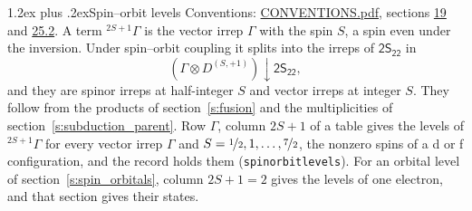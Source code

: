 \documentclass[10pt,a4paper]{article}
\makeatletter
\renewcommand\section{\@startsection{section}{1}{\z@}{-3ex plus -1ex minus -.2ex}%
  {1.2ex plus .2ex}{\normalfont\large\sffamily\bfseries\color{parttitle}}}
\numberwithin{equation}{section}
\newcommand{\grp}[1]{\mathsf{#1}}
\newcommand{\restr}[2]{#1\!\downarrow#2}
\newcommand{\irrJp}[2]{D^{(#1,#2)}}
\newcommand{\irrprod}{\otimes}
\newcommand{\term}[2]{{}^{#1}#2}
\makeatother
\begin{document}
\section{Spin--orbit levels}\label{s:spin_orbit}
Conventions: \href{../../CONVENTIONS.pdf}{CONVENTIONS.pdf}, sections \href{../../../rotation/CONVENTIONS.pdf\#conv.19}{19} and \href{../../CONVENTIONS.pdf\#conv.25.2}{25.2}.
\leavevmode\label{n:local.spin}\label{n:symbol.term}A term $\term{2S+1}{\Gamma}$ is the vector irrep $\Gamma$ with the spin $S$, a spin even under the inversion. Under spin--orbit coupling it splits into the irreps of $\grp{2S_{22}}$ in
\begin{equation}\label{e:spinorbit}\restr{(\Gamma \irrprod \irrJp{S}{+1})}{\grp{2S_{22}}},\end{equation}
and they are spinor irreps at half-integer $S$ and vector irreps at integer $S$. They follow from the products of section~\ref{s:fusion} and the multiplicities of section~\ref{s:subduction_parent}. Row $\Gamma$, column $2S + 1$ of a table gives the levels of $\term{2S+1}{\Gamma}$ for every vector irrep $\Gamma$ and $S = \nicefrac{1}{2}, 1, \dots, \nicefrac{7}{2}$, the nonzero spins of a d or f configuration, and the record holds them (\texttt{spinorbitlevels}). For an orbital level of section~\ref{s:spin_orbitals}, column $2S + 1 = 2$ gives the levels of one electron, and that section gives their states.
\end{document}
